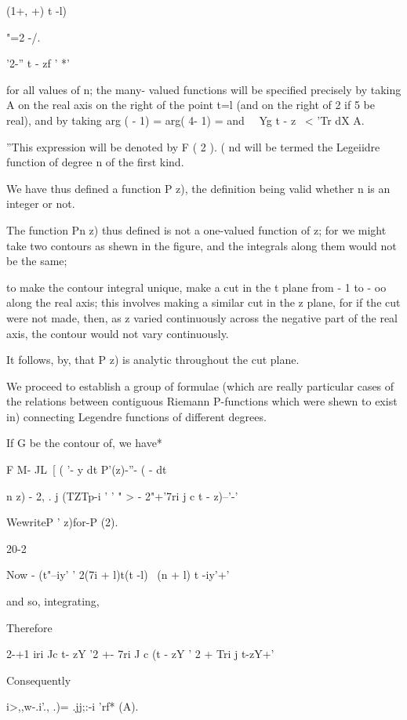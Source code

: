 {(1+, +) t -l)

"=2 -/.

  '2-'' t - zf ' *'

for all values of n; the many- valued functions will be specified
precisely by taking A on the real axis on the right of the point t=l
(and on the right of 2 if 5 be real), and by taking arg ( - 1) = arg(
4- 1) = and \ \ Yg t - z \ < 'Tr dX A.

''This expression will be denoted by F ( 2 ). ( nd will be termed the
Legeiidre function of degree n of the first kind.

We have thus defined a function P z), the definition being valid
whether n is an integer or not.

The function Pn z) thus defined is not a one-valued function of z;
for we might take two contours as shewn in the figure, and the
integrals along them would not be the same;

to make the contour integral unique, make a cut in the t plane from -
1 to - oo along the real axis; this involves making a similar cut in
the z plane, for if the cut were not made, then, as z varied
continuously across the negative part of the real axis, the contour
would not vary continuously.

It follows, by, that P z) is analytic throughout the cut plane.


We proceed to establish a group of formulae (which are really
particular cases of the relations between contiguous Riemann
P-functions which were shewn to exist in) connecting Legendre
functions of different degrees.

If G be the contour of, we have*

F M- JL\ [ ( '- y dt P'(z)-''- ( - dt

 n z) - 2, . j (TZTp-i ' ' " > - 2"+'7ri j c t - z)--'-'

WewriteP ' z)for-P (2).

20-2

%
%

Now - (t"--iy' ' 2(7i + l)t(t -l) \ (n + l) t -iy'+'

and so, integrating,

Therefore

2-+1 iri Jc t- zY '2 +- 7ri J c (t - zY ' 2 + Tri j t-zY+'

Consequently

i>,,w-.i'., .)= .jj;:-i 'rf* (A).

}
